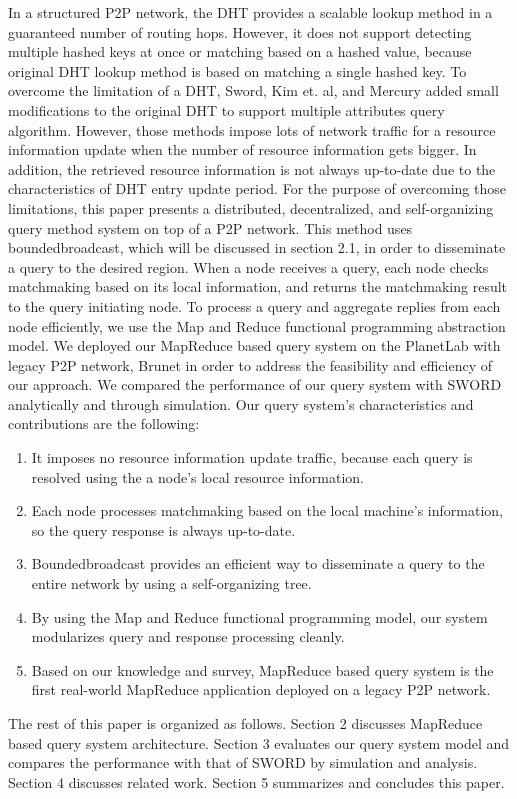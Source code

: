 \documentclass{acm_proc_article-sp}
\begin{document}
In a structured P2P network, the DHT provides a scalable lookup method in a guaranteed number of routing hops. 
However, it does not support detecting multiple hashed keys at once or matching based on a hashed value, because original DHT lookup method is based on matching a single hashed key.
To overcome the limitation of a DHT, Sword\cite{sword}, Kim et. al\cite{can_query}, and Mercury\cite{mercury} added small modifications to the original DHT to support multiple attributes query algorithm.
However, those methods impose lots of network traffic for a resource information update when the number of resource information gets bigger. 
In addition, the retrieved resource information is not always up-to-date due to the characteristics of DHT entry update period.
For the purpose of overcoming those limitations, this paper presents a distributed, decentralized, and self-organizing query method system on top of a P2P network. 
This method uses boundedbroadcast, which will be discussed in section 2.1, in order to disseminate a query to the desired region.
When a node receives a query, each node checks matchmaking based on its local information, and returns the matchmaking result to the query initiating node.
To process a query and aggregate replies from each node efficiently, we use the Map and Reduce functional programming abstraction model.
We deployed our MapReduce based query system on the PlanetLab\cite{planetlab} with legacy P2P network, Brunet\cite{brunet} in order to address the feasibility and efficiency of our approach. 
We compared the performance of our query system with SWORD\cite{sword} analytically and through simulation.
Our query system's characteristics and contributions are the following:
\begin{enumerate}
\setlength{\itemsep}{0pt}
\setlength{\parskip}{0pt}
\item It imposes no resource information update traffic, because each query is resolved using the a node's local resource information.
\item Each node processes matchmaking based on the local machine's information, so the query response is always up-to-date.
\item Boundedbroadcast provides an efficient way to disseminate a query to the entire network by using a self-organizing tree.
\item By using the Map and Reduce functional programming model, our system modularizes query and response processing cleanly.
\item Based on our knowledge and survey, MapReduce based query system is the first real-world MapReduce application deployed on a legacy P2P network.
\end{enumerate}
The rest of this paper is organized as follows. 
Section 2 discusses MapReduce based query system architecture. 
Section 3 evaluates our query system model and compares the performance with that of SWORD by simulation and analysis. Section 4 discusses related work.
Section 5 summarizes and concludes this paper.
\end{document}

